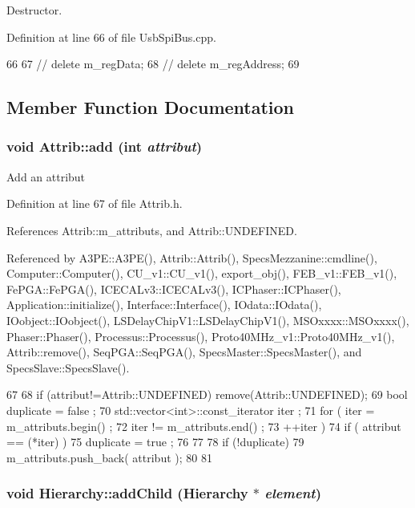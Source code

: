 Destructor. 

Definition at line 66 of file UsbSpiBus.cpp.


\begin{DoxyCode}
66                       {
67 //  delete m_regData;
68 //  delete m_regAddress;
69 }
\end{DoxyCode}


\subsection{Member Function Documentation}
\hypertarget{classAttrib_a235f773af19c900264a190b00a3b4ad7}{
\subsubsection[{add}]{\setlength{\rightskip}{0pt plus 5cm}void Attrib::add (int {\em attribut})}}
\label{classAttrib_a235f773af19c900264a190b00a3b4ad7}
Add an attribut 

Definition at line 67 of file Attrib.h.

References Attrib::m\_\-attributs, and Attrib::UNDEFINED.

Referenced by A3PE::A3PE(), Attrib::Attrib(), SpecsMezzanine::cmdline(), Computer::Computer(), CU\_\-v1::CU\_\-v1(), export\_\-obj(), FEB\_\-v1::FEB\_\-v1(), FePGA::FePGA(), ICECALv3::ICECALv3(), ICPhaser::ICPhaser(), Application::initialize(), Interface::Interface(), IOdata::IOdata(), IOobject::IOobject(), LSDelayChipV1::LSDelayChipV1(), MSOxxxx::MSOxxxx(), Phaser::Phaser(), Processus::Processus(), Proto40MHz\_\-v1::Proto40MHz\_\-v1(), Attrib::remove(), SeqPGA::SeqPGA(), SpecsMaster::SpecsMaster(), and SpecsSlave::SpecsSlave().


\begin{DoxyCode}
67                             {
68     if (attribut!=Attrib::UNDEFINED) remove(Attrib::UNDEFINED);
69     bool duplicate = false ;
70     std::vector<int>::const_iterator iter ;
71     for ( iter  = m_attributs.begin() ;
72           iter != m_attributs.end()   ;
73           ++iter ) {
74       if ( attribut == (*iter) ) {
75         duplicate = true ;
76       }
77     }
78     if (!duplicate) {
79       m_attributs.push_back( attribut );
80     }
81   }
\end{DoxyCode}
\hypertarget{classHierarchy_ad677774ff38fcb257c04a3a10d471fac}{
\subsubsection[{addChild}]{\setlength{\rightskip}{0pt plus 5cm}void Hierarchy::addChild ({\bf Hierarchy} $\ast$ {\em element})}}
\label{classHierarchy_ad677774ff38fcb257c04a3a10d471fac}


